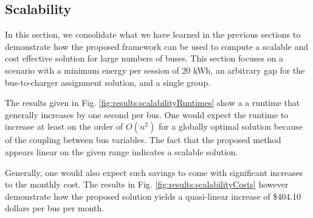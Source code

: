 \subsection{Scalability}
In this section, we consolidate what we have learned in the previous sections to demonstrate how the proposed framework can be used to compute a scalable and cost effective solution for large numbers of buses. This section focuses on a scenario with a minimum energy per session of 20 kWh, an arbitrary gap for the bus-to-charger assignment solution, and a single group.
\par The results given in Fig. \ref{fig:results:scalabilityRuntimes} show a a runtime that generally increases by one second per bus.  One would expect the runtime to increase at least on the order of $O(n^2)$ for a globally optimal solution because of the coupling between bus variables. The fact that the proposed method appears linear on the given range indicates a scalable solution. 
\par Generally, one would also expect such savings to come with significant increases to the monthly cost. The results in Fig. \ref{fig:results:scalabilityCosts} however demonstrate how the proposed solution yields a quasi-linear increase of \$404.10 dollars per bus per month. 


	
	
